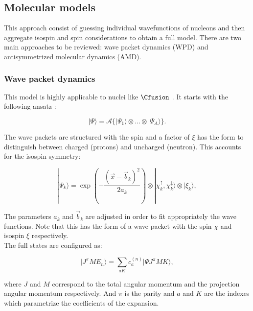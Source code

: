 \documentclass[openany]{book}
\begin{document}
\subsection{Molecular models}
\label{sub:microscopical_molecular}

This approach consist of guessing individual wavefunctions of nucleons and then aggregate isospin and spin considerations to obtain a full model. There are two main approaches to be reviewed: wave packet dynamics (WPD) and antisymmetrized molecular dynamics (AMD). 

\subsubsection{Wave packet dynamics}

This model is highly applicable to nuclei like $\Cfusion$ \cite{diaz-torres_wiescher_2018}. It starts with the following ansatz \cite{neff_feldmeier_langanke_2011}: 

\begin{equation}\label{eq:micro_FMD_state}
	| \Psi \rangle = \mathcal{A} \{ |\Psi_1 \rangle \otimes ... \otimes |\Psi_A \rangle \}.
\end{equation}

The wave packets are structured with the spin and a factor of $\xi$ has the form to distinguish between charged (protons) and uncharged (neutron). This accounts for the isospin symmetry:

\begin{equation} \label{eq:micro_FMD_wavePacket}
	|\Psi_k \rangle = \exp {\left ( - \frac{(\vec x - \vec b_k)^2}{2a_k} \right)} \otimes |\chi^{\uparrow}_k,  \chi^{\downarrow}_k \rangle \otimes |\xi_k \rangle, 
\end{equation}

The parameters $a_k$ and $\vec b_k$ are adjusted in order to fit appropriately the wave functions. Note that this has the form of a wave packet with the spin  $\chi$ and isospin  $\xi$ respectively. \\

The full states are configured as: 

\begin{equation} \label{eq:micro_FMD_generalState}
	| J^{\pi} M E_n \rangle = \sum_{aK}{c^{(n)}_a | \Psi J^\pi MK \rangle} , 
\end{equation}

where $J$ and $M$ correspond to the total angular momentum and the projection angular momentum respectively. And $\pi$ is the parity and $a$ and $K$ are the indexes which parametrize the coefficients of the expansion.  \\
\end{document}
